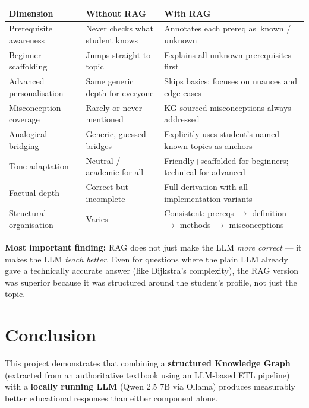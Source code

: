 \documentclass[12pt,a4paper]{article}
\newcommand{\tick}{\textcolor{darkgreen}{\ding{51}}}
\newcommand{\cross}{\textcolor{darkred}{\ding{55}}}
\begin{document}
\begin{center}
\begin{tabularx}{\textwidth}{lXX}
  \toprule
  \textbf{Dimension} & \textbf{Without RAG} & \textbf{With RAG} \\
  \midrule
  Prerequisite awareness &
    Never checks what student knows &
    Annotates each prereq as \tick\,known / \cross\,unknown \\[4pt]
  Beginner scaffolding &
    Jumps straight to topic &
    Explains all unknown prerequisites first \\[4pt]
  Advanced personalisation &
    Same generic depth for everyone &
    Skips basics; focuses on nuances and edge cases \\[4pt]
  Misconception coverage &
    Rarely or never mentioned &
    KG-sourced misconceptions always addressed \\[4pt]
  Analogical bridging &
    Generic, guessed bridges &
    Explicitly uses student's named known topics as anchors \\[4pt]
  Tone adaptation &
    Neutral / academic for all &
    Friendly+scaffolded for beginners; technical for advanced \\[4pt]
  Factual depth &
    Correct but incomplete &
    Full derivation with all implementation variants \\[4pt]
  Structural organisation &
    Varies &
    Consistent: prereqs $\to$ definition $\to$ methods $\to$
    misconceptions \\
  \bottomrule
\end{tabularx}
\end{center}

\textbf{Most important finding:} RAG does not just make the LLM \textit{more
correct} --- it makes the LLM \textit{teach better}. Even for questions where
the plain LLM already gave a technically accurate answer (like Dijkstra's
complexity), the RAG version was superior because it was structured around the
student's profile, not just the topic.

\section{Conclusion}

This project demonstrates that combining a \textbf{structured Knowledge Graph}
(extracted from an authoritative textbook using an LLM-based ETL pipeline) with
a \textbf{locally running LLM} (Qwen 2.5 7B via Ollama) produces measurably
better educational responses than either component alone.
\end{document}
